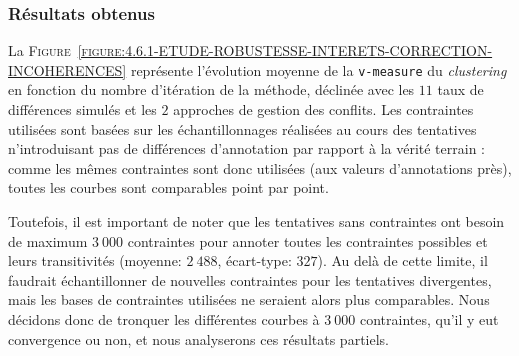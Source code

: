 		\subsubsection{Résultats obtenus}
		
			La \textsc{Figure~\ref{figure:4.6.1-ETUDE-ROBUSTESSE-INTERETS-CORRECTION-INCOHERENCES}} représente l'évolution moyenne de la \texttt{v-measure} du \textit{clustering} en fonction du nombre d'itération de la méthode, déclinée avec les $11$ taux de différences simulés et les $2$ approches de gestion des conflits.
			Les contraintes utilisées sont basées sur les échantillonnages réalisées au cours des tentatives n'introduisant pas de différences d'annotation par rapport à la vérité terrain : comme les mêmes contraintes sont donc utilisées (aux valeurs d'annotations près), toutes les courbes sont comparables point par point.
			
			\begin{leftBarWarning}
				Toutefois, il est important de noter que les tentatives sans contraintes ont besoin de maximum $3~000$ contraintes pour annoter toutes les contraintes possibles et leurs transitivités (moyenne: $2~488$, écart-type: $327$).
				Au delà de cette limite, il faudrait échantillonner de nouvelles contraintes pour les tentatives divergentes, mais les bases de contraintes utilisées ne seraient alors plus comparables.
				Nous décidons donc de tronquer les différentes courbes à $3~000$ contraintes, qu'il y eut convergence ou non, et nous analyserons ces résultats partiels.
			\end{leftBarWarning}
			
